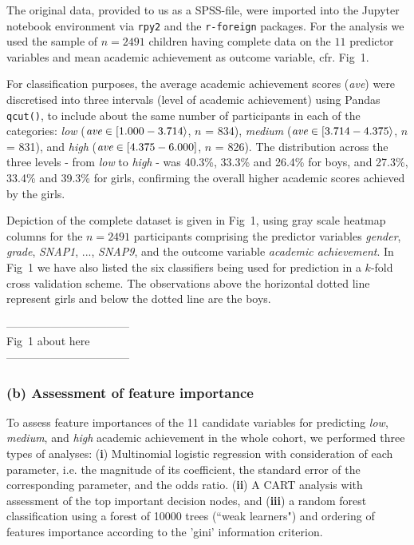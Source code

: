 \documentclass[10pt,letterpaper]{article}
\begin{document}
The original data, provided to us as a SPSS-file, were imported into the Jupyter notebook environment via {\tt rpy2} and the {\tt r-foreign} packages. 
For the analysis we used the sample of  $n=2491$ children having complete data 
on the $11$ predictor variables and mean academic achievement as outcome variable, cfr. Fig~1.

 For classification purposes, the average academic achievement scores (\emph{ave}) were discretised into three intervals (level of academic achievement) 
 using Pandas {\tt qcut()}, to include about the same number of participants in each of the categories:  
{\it low} (${\text{\it ave}} \in [1.000 - 3.714\rangle$,  $n$ = 834),
{\it medium} (${\text{\it ave}} \in [3.714 - 4.375\rangle$, $n$ = 831), and
{\it high} (${\text{\it ave}} \in [4.375 - 6.000]$, $n$ = 826). 
The distribution across the three levels - from {\it low} to {\it high} - was 
40.3\%, 33.3\% and 26.4\% for boys, and 27.3\%, 33.4\% and 39.3\% for girls, 
confirming the overall higher academic scores achieved by the girls. 

Depiction of the complete dataset is given in Fig~1,  using gray scale heatmap columns for the $n=2491$ participants comprising 
the predictor variables {\it gender}, {\it grade}, 
{\it SNAP1}, ..., {\it SNAP9}, and the outcome variable {\it academic achievement}. In Fig~1 we have also listed the
 six classifiers being used for prediction in a $k$-fold cross validation scheme. The observations above the horizontal dotted line represent girls and below the dotted line are the boys.

 \vspace{3mm}
 
 \begin{center}
 ---------------------------------\\
 
 Fig~1 about here \\
 
  ---------------------------------\\
  \end{center}
  
  \vspace{3mm}
  
 
 \subsubsection*{(b) Assessment of feature importance} 
  To assess feature importances of the 11 candidate variables for predicting {\it low}, {\it medium}, and {\it high} academic achievement in the whole cohort,
 we performed three types of analyses: ({\bf i}) Multinomial logistic regression with consideration of each parameter, i.e. the magnitude of its coefficient, the standard error of the corresponding parameter, and the odds ratio. 
 ({\bf ii}) A CART analysis with assessment 
 of the top important decision nodes, and ({\bf iii}) a random forest classification using a forest of 10000 trees (``weak learners") and ordering of features importance according
  to the 'gini' information criterion. 
 
\end{document}
